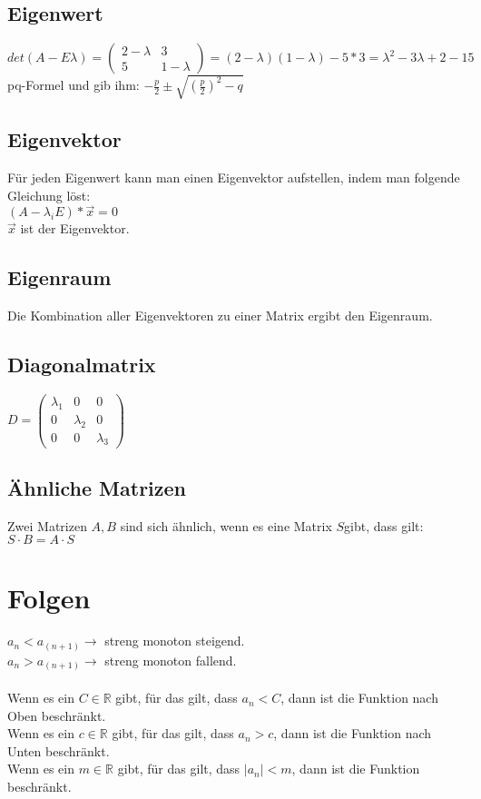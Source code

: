 \documentclass[a4paper,landscape, 11pt]{article}
\begin{document}
\begin{multicols}{5}
\begin{small}
        \subsection{Eigenwert}
        $det(A - E\lambda) = 
        \left(
        \begin{matrix}
            2-\lambda & 3 \\
            5 & 1-\lambda
        \end{matrix}
        \right) = (2-\lambda)(1-\lambda) - 5*3 = \lambda^2 - 3\lambda  + 2 - 15$\\
        pq-Formel und gib ihm: $-\frac{p}{2}\pm\sqrt{(\frac{p}{2})^2-q}$
        
        \subsection{Eigenvektor}
        Für jeden Eigenwert kann man einen Eigenvektor aufstellen, indem man folgende Gleichung löst: \\
        $ (A - \lambda_iE)*\vec{x} = 0$\\
        $\vec{x}$ ist der Eigenvektor.
        
        \subsection{Eigenraum}
        Die Kombination aller Eigenvektoren zu einer Matrix ergibt den Eigenraum.
        \subsection{Diagonalmatrix}
        $D=\begin{pmatrix}
        \lambda_1 & 0 & 0 \\
        0 & \lambda_2 & 0 \\
        0 & 0 & \lambda_3 
        \end{pmatrix}$
        \subsection{Ähnliche Matrizen}
        Zwei Matrizen $A, B$ sind sich ähnlich, wenn es eine Matrix $S$gibt, dass gilt: \\
        $S\cdot B = A \cdot S$
    \section{Folgen}
    $a_n < a_(n+1) \rightarrow$ streng monoton steigend. \\
    $a_n > a_(n+1) \rightarrow$ streng monoton fallend. \\ 
    \\ 
    Wenn es ein $C \in \mathbb{R}$ gibt, für das gilt, dass $a_n < C$, dann ist die Funktion nach Oben beschränkt. \\
    Wenn es ein $c \in \mathbb{R}$ gibt, für das gilt, dass $a_n > c$, dann ist die Funktion nach Unten beschränkt. \\
    Wenn es ein $m \in \mathbb{R}$ gibt, für das gilt, dass $ | a_n | < m$, dann ist die Funktion beschränkt.
        

\end{small}
\end{multicols}
\end{document}
